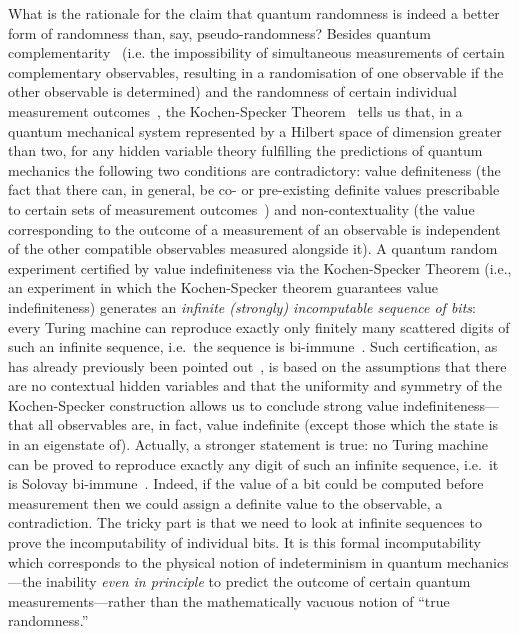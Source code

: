 \documentclass{mscs}
\begin{document}
What is the rationale for the claim that quantum randomness is indeed a better form of randomness than, say, pseudo-randomness?
Besides quantum complementarity~\citep{pauli:58}
(i.e. the impossibility of simultaneous measurements of certain complementary observables,
resulting in a randomisation of one observable if the other observable is determined)
and the randomness of certain individual measurement outcomes~\citep{born-69}, the
Kochen-Specker Theorem~\citep{kochen1} tells us that, in a quantum mechanical system represented by a Hilbert space of dimension greater than two,
for any hidden variable theory fulfilling the predictions of quantum mechanics the following two conditions are contradictory:
value definiteness (the fact that there can, in general,
be  co- or pre-existing definite values prescribable to certain sets of measurement outcomes~\citep{2008-cal-svo,svozil_2010-pc09})
and  non-contextuality (the value corresponding to the outcome of a measurement of  an observable is independent of the other compatible observables measured alongside it).
A quantum random experiment certified by value
indefiniteness via the Kochen-Specker Theorem (i.e., an experiment in which the Kochen-Specker theorem guarantees value indefiniteness)
generates an {\em infinite (strongly) incomputable sequence of bits}: every Turing machine can reproduce exactly only finitely many scattered digits of such an infinite sequence, i.e.\ the sequence is bi-immune~\citep{2008-cal-svo}.
Such certification, as has already previously been pointed out~\citep{2008-cal-svo}, is based on the assumptions that there are no contextual hidden variables and that the uniformity and symmetry of the Kochen-Specker construction allows us to conclude strong value indefiniteness---that all observables are, in fact, value indefinite (except those which the state is in an eigenstate of).
Actually, a stronger statement is true:  no Turing machine  can be proved to reproduce exactly any  digit of such an infinite sequence,
i.e.\ it is Solovay bi-immune~\citep{Abbott:aa}.
Indeed, if the value of a bit could be computed before measurement then we could assign a
definite value to the observable, a  contradiction.
The tricky part is that we need to look at infinite sequences to prove the incomputability of individual bits. It is this formal incomputability which corresponds to the physical notion of indeterminism in quantum mechanics---the inability {\em even in principle} to predict the outcome of certain quantum measurements---rather than the mathematically vacuous notion of ``true randomness.''
\end{document}
